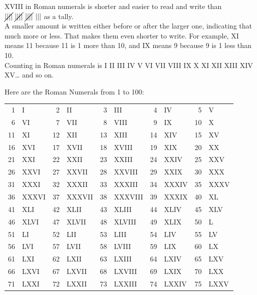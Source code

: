 \documentclass{article}
\begin{document}
\begin{enumerate}
XVIII in Roman numerals is shorter and easier to read and write than $\cancel{||||}\ \cancel{||||}\ \cancel{||||}\ |||$ as a tally.\\

A smaller amount is written either before or after the larger one, indicating that much more or less. That makes them even shorter to write. For example, XI means 11 because 11 is 1 more than  10, and IX means 9 because 9 is 1 less than 10.\\

Counting in Roman numerals is I II III IV V VI VII VIII IX X XI XII XIII XIV XV… and so on.\\

\newpage

Here are the Roman Numerals from 1 to 100:
\begin{center}
\scriptsize
\renewcommand*{\arraystretch}{1.4}
		\begin{tabular}{rlrlrlrlrl}
			1  & I      & 2  & II      & 3  & III      & 4  & IV     & 5  & V    \\
			6  & VI     & 7  & VII     & 8  & VIII     & 9  & IX     & 10 & X    \\
			11 & XI     & 12 & XII     & 13 & XIII     & 14 & XIV    & 15 & XV   \\
			16 & XVI    & 17 & XVII    & 18 & XVIII    & 19 & XIX    & 20 & XX   \\
			21 & XXI    & 22 & XXII    & 23 & XXIII    & 24 & XXIV   & 25 & XXV  \\
			26 & XXVI   & 27 & XXVII   & 28 & XXVIII   & 29 & XXIX   & 30 & XXX  \\
			31 & XXXI   & 32 & XXXII   & 33 & XXXIII   & 34 & XXXIV  & 35 & XXXV \\
			36 & XXXVI  & 37 & XXXVII  & 38 & XXXVIII  & 39 & XXXIX  & 40 & XL   \\
			41 & XLI    & 42 & XLII    & 43 & XLIII    & 44 & XLIV   & 45 & XLV  \\
			46 & XLVI   & 47 & XLVII   & 48 & XLVIII   & 49 & XLIX   & 50 & L    \\
			51 & LI     & 52 & LII     & 53 & LIII     & 54 & LIV    & 55 & LV   \\
			56 & LVI    & 57 & LVII    & 58 & LVIII    & 59 & LIX    & 60 & LX   \\
			61 & LXI    & 62 & LXII    & 63 & LXIII    & 64 & LXIV   & 65 & LXV  \\
			66 & LXVI   & 67 & LXVII   & 68 & LXVIII   & 69 & LXIX   & 70 & LXX  \\
			71 & LXXI   & 72 & LXXII   & 73 & LXXIII   & 74 & LXXIV  & 75 & LXXV \\

\end{tabular}
\end{center}
\end{enumerate}
\end{document}
